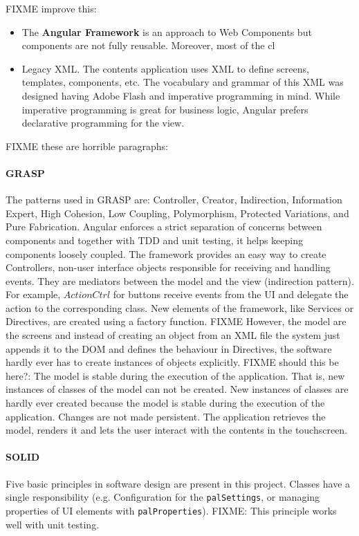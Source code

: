 FIXME improve this:
\begin{itemize}
    \item The \textbf{Angular Framework} is an approach to Web Components but components are not fully reusable. Moreover, most of the cl
    \item  Legacy \ac{XML}. The contents application uses \ac{XML} to define screens, templates, components, etc. The vocabulary and grammar of this \ac{XML} was designed having Adobe Flash and imperative programming in mind. While imperative programming is great for business logic, Angular prefers declarative programming for the view. 
\end{itemize}

 FIXME these are horrible paragraphs:
\paragraph{\ac{GRASP}} The patterns used in \ac{GRASP} are: Controller, Creator, Indirection, Information Expert, High Cohesion, Low Coupling, Polymorphism, Protected Variations, and Pure Fabrication. 
Angular enforces a strict separation of concerns between components and together with \ac{TDD} and unit testing, it helps keeping components loosely coupled.
The framework provides an easy way to create Controllers, non-user interface objects responsible for receiving and handling events.
They are mediators between the model and the view (indirection pattern). 
For example, $ActionCtrl$ for buttons receive events from the \ac{UI} and delegate the action to the corresponding class.
New elements of the framework, like Services or Directives, are created using a factory function.
FIXME However, the model are the screens and instead of creating an object from an \ac{XML} file the system just appends it to the \ac{DOM} and defines the behaviour in Directives, the software hardly ever has to create instances of objects explicitly.
FIXME should this be here?: The model is stable during the execution of the application. That is, new instances of classes of the model can not be created. 
New instances of classes are hardly ever created because the model is stable during the execution of the application. 
Changes are not made persistent. 
The application retrieves the model, renders it and lets the user interact with the contents in the touchscreen.

\paragraph{\ac{SOLID}} Five basic principles in software design are present in this project.
Classes have a single responsibility (e.g. Configuration for the \texttt{palSettings}, or managing properties of \ac{UI} elements with \texttt{palProperties}). 
FIXME: This principle works well with unit testing.


